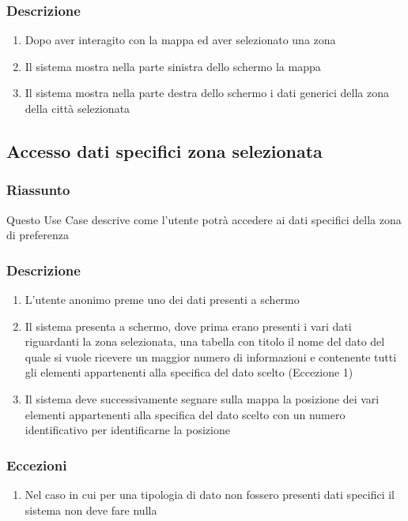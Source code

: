         \subsubsection{Descrizione}
            \begin{enumerate}
                \item Dopo aver interagito con la mappa ed aver selezionato una zona
                \item Il sistema mostra nella parte sinistra dello schermo la mappa
                \item Il sistema mostra nella parte destra dello schermo i dati generici della zona della città selezionata
            \end{enumerate}

    \subsection{Accesso dati specifici zona selezionata}
        \subsubsection{Riassunto}
            Questo Use Case descrive come l'utente potrà accedere ai dati specifici della zona di preferenza
        \subsubsection{Descrizione}
            \begin{enumerate}
                \item L'utente anonimo preme uno dei dati presenti a schermo
                \item Il sistema presenta a schermo, dove prima erano presenti i vari dati riguardanti la zona selezionata, una tabella con titolo il nome del dato del quale si vuole ricevere un maggior numero di informazioni e contenente tutti gli elementi appartenenti alla specifica del dato scelto (Eccezione 1)
                \item Il sistema deve successivamente segnare sulla mappa la posizione dei vari elementi appartenenti alla specifica del dato scelto con un numero identificativo per identificarne la posizione
            \end{enumerate}
        \subsubsection{Eccezioni}
            \begin{enumerate}
                \item Nel caso in cui per una tipologia di dato non fossero presenti dati specifici il sistema non deve fare nulla
            \end{enumerate}
